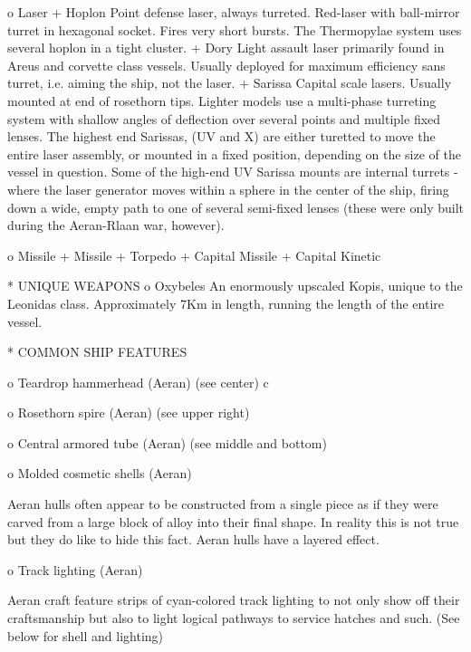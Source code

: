           o Laser
                + Hoplon
                  Point defense laser, always turreted. Red-laser with ball-mirror turret in hexagonal socket. Fires very short bursts.
                  The Thermopylae system uses several hoplon in a tight cluster.
                + Dory
                  Light assault laser primarily found in Areus and corvette class vessels.
                  Usually deployed for maximum efficiency sans turret, i.e. aiming the ship, not the laser.
                + Sarissa
                  Capital scale lasers. Usually mounted at end of rosethorn tips. Lighter models use a multi-phase turreting system with shallow angles of deflection over several points and multiple fixed lenses.
                  The highest end Sarissas, (UV and X) are either turetted to move the entire laser assembly, or mounted in a fixed position, depending on the size of the vessel in question.
                  Some of the high-end UV Sarissa mounts are internal turrets - where the laser generator moves within a sphere in the center of the ship, firing down a wide, empty path to one of several semi-fixed lenses (these were only built during the Aeran-Rlaan war, however).

          o Missile
                + Missile
                + Torpedo
                + Capital Missile
                + Capital Kinetic

    * UNIQUE WEAPONS
          o Oxybeles
            An enormously upscaled Kopis, unique to the Leonidas class. Approximately 7Km in length, running the length of the entire vessel.


    * COMMON SHIP FEATURES

          o Teardrop hammerhead (Aeran)
            (see center)
            c

          o Rosethorn spire (Aeran)
            (see upper right)

          o Central armored tube (Aeran)
            (see middle and bottom)

          o Molded cosmetic shells (Aeran)

                Aeran hulls often appear to be constructed from a single piece as if they were carved from a large block of alloy into their final shape.  In reality this is not true but they do like to hide this fact.  Aeran hulls have a layered effect.

          o Track lighting (Aeran)

                Aeran craft feature strips of cyan-colored track lighting to not only show off their craftsmanship but also to light logical pathways to service hatches and such.
                (See below for shell and lighting)               

